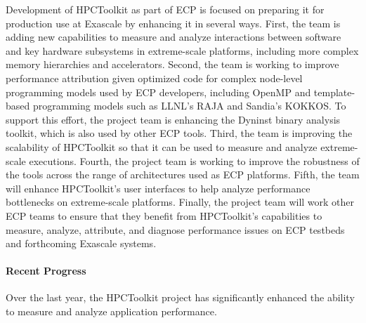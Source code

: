 Development of HPCToolkit as part of ECP is focused on preparing it for production use at Exascale by enhancing it in several ways. First, the team is adding new capabilities to measure and analyze interactions between software and key hardware subsystems in extreme-scale platforms, including more complex memory hierarchies and accelerators. Second, the team is working to improve performance attribution given optimized code for complex node-level programming models used by ECP developers, including OpenMP and template-based programming models such as LLNL's RAJA and Sandia's KOKKOS. To support this effort, the project team is enhancing the Dyninst binary analysis toolkit, which is also used by other ECP tools. Third, the team is improving the scalability of HPCToolkit so that it can be used to measure and analyze extreme-scale executions. Fourth, the project team is working to improve the robustness of the tools across the range of architectures used as ECP platforms. Fifth, the team will enhance HPCToolkit's user interfaces to help analyze performance bottlenecks on extreme-scale platforms.  Finally, the project team will work other ECP teams to ensure that they benefit from HPCToolkit's capabilities to measure, analyze, attribute, and diagnose performance issues on ECP testbeds and forthcoming Exascale systems.  

\paragraph{Recent Progress}

Over the last year, the HPCToolkit project has significantly enhanced the ability to measure and analyze application performance. 

